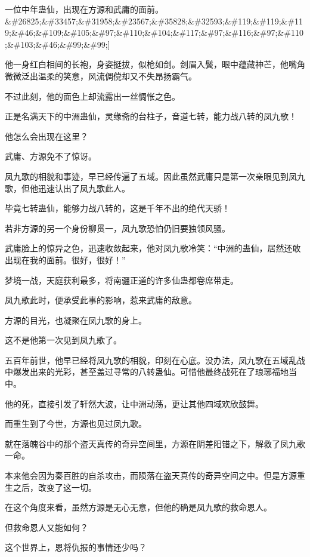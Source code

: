 
\begin{this_body}

一位中年蛊仙，出现在方源和武庸的面前。\&\#26825;\&\#33457;\&\#31958;\&\#23567;\&\#35828;\&\#32593;\&\#119;\&\#119;\&\#119;\&\#46;\&\#109;\&\#105;\&\#97;\&\#110;\&\#104;\&\#117;\&\#97;\&\#116;\&\#97;\&\#110;\&\#103;\&\#46;\&\#99;\&\#99;]

他一身红白相间的长袍，身姿挺拔，似枪如剑。剑眉入鬓，眼中蕴藏神芒，他嘴角微微泛出温柔的笑意，风流倜傥却又不失昂扬霸气。

不过此刻，他的面色上却流露出一丝惆怅之色。

正是名满天下的中洲蛊仙，灵缘斋的台柱子，音道七转，能力战八转的凤九歌！

他怎么会出现在这里？

武庸、方源免不了惊讶。

凤九歌的相貌和事迹，早已经传遍了五域。因此虽然武庸只是第一次亲眼见到凤九歌，但他迅速认出了凤九歌此人。

毕竟七转蛊仙，能够力战八转的，这是千年不出的绝代天骄！

若非方源的另一个身份柳贯一，凤九歌恐怕仍旧要独领风骚。

武庸脸上的惊异之色，迅速收敛起来，他对凤九歌冷笑：“中洲的蛊仙，居然还敢出现在我的面前。很好，很好！”

梦境一战，天庭获利最多，将南疆正道的许多仙蛊都卷席带走。

凤九歌此时，便承受此事的影响，惹来武庸的敌意。

方源的目光，也凝聚在凤九歌的身上。

这不是他第一次见到凤九歌了。

五百年前世，他早已经将凤九歌的相貌，印刻在心底。没办法，凤九歌在五域乱战中爆发出来的光彩，甚至盖过寻常的八转蛊仙。可惜他最终战死在了琅琊福地当中。

他的死，直接引发了轩然大波，让中洲动荡，更让其他四域欢欣鼓舞。

而重生到了今世，方源也见过凤九歌。

就在落魄谷中的那个盗天真传的奇异空间里，方源在阴差阳错之下，解救了凤九歌一命。

本来他会因为秦百胜的自杀攻击，而陨落在盗天真传的奇异空间之中。但是方源重生之后，改变了这一切。

在这个角度来看，虽然方源是无心无意，但他的确是凤九歌的救命恩人。

但救命恩人又能如何？

这个世界上，恩将仇报的事情还少吗？


\end{this_body}
